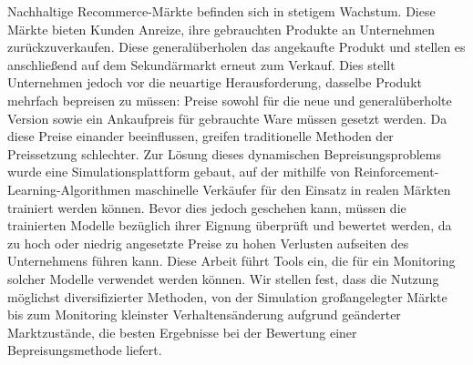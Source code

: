 Nachhaltige Recommerce-Märkte befinden sich in stetigem Wachstum. Diese Märkte bieten Kunden Anreize, ihre gebrauchten Produkte an Unternehmen zurückzuverkaufen. Diese generalüberholen das angekaufte Produkt und stellen es anschließend auf dem Sekundärmarkt erneut zum Verkauf. Dies stellt Unternehmen jedoch vor die neuartige Herausforderung, dasselbe Produkt mehrfach bepreisen zu müssen: Preise sowohl für die neue und generalüberholte Version sowie ein Ankaufpreis für gebrauchte Ware müssen gesetzt werden. Da diese Preise einander beeinflussen, greifen traditionelle Methoden der Preissetzung schlechter. Zur Lösung dieses dynamischen Bepreisungsproblems wurde eine Simulationsplattform gebaut, auf der mithilfe von Reinforcement-Learning-Algorithmen maschinelle Verkäufer für den Einsatz in realen Märkten trainiert werden können. Bevor dies jedoch geschehen kann, müssen die trainierten Modelle bezüglich ihrer Eignung überprüft und bewertet werden, da zu hoch oder niedrig angesetzte Preise zu hohen Verlusten aufseiten des Unternehmens führen kann. Diese Arbeit führt Tools ein, die für ein Monitoring solcher Modelle verwendet werden können. Wir stellen fest, dass die Nutzung möglichst diversifizierter Methoden, von der Simulation großangelegter Märkte bis zum Monitoring kleinster Verhaltensänderung aufgrund geänderter Marktzustände, die besten Ergebnisse bei der Bewertung einer Bepreisungsmethode liefert.